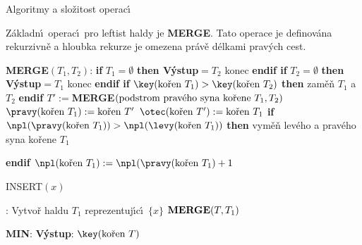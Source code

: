 \documentclass[a4paper,12pt]{article}
\begin{document}
\head
Algoritmy a slo\v zitost operac\'\i
\endhead

\flushpar Z\'akladn\'\i\ operac\'\i\ pro leftist haldy je {\bf MERGE}. Tato 
operace je definov\'ana rekurzivn\v e a hloubka rekurze je omezena 
pr\'av\v e d\'elkami prav\'ych cest.
\bigskip

{\bf MERGE$(T_1,T_2)$}:\newline 
{\bf if} $T_1=\emptyset$ {\bf then V\'ystup$=T_2$} konec {\bf endif\newline 
if} $T_2=\emptyset$ {\bf then V\'ystup$=T_1$} konec {\bf endif\newline 
if} $\key(\text{\rm ko\v ren }T_1)>\key(\text{\rm ko\v ren }T_2)$ {\bf then\newline 
\phantom{{\rm ---}}}zam\v e\v n $T_1$ a $T_2$\newline 
{\bf endif\newline 
$T':=$MERGE$(\text{{{\rm podstrom prav\'eho syna ko\v rene }}}T_1
,T_2)$\newline 
$\pravy(\text{\rm{{\rm ko\v ren }}}T_1):=\text{\rm{{\rm ko\v ren }}}
T'$\newline 
$\otec(\text{\rm {\rm ko\v ren }}T'):=\text{\rm {\rm ko\v ren }}T_
1$\newline 
if} $\npl(\pravy(\text{\rm ko\v ren }T_1))>\npl(\levy(\text{\rm ko\v ren }
T_1))$ {\bf then\newline 
\phantom{{\rm ---}}}vym\v e\v n lev\'eho a prav\'eho syna ko\v rene $
T_1$\newline 
{\bf endif\newline 
$\npl(\text{{\rm {\rm ko\v ren }}}T_1):=\npl(\pravy(\text{{\rm {\rm ko\v ren }}}
T_1)+1$
\bigskip

INSERT$(x)$}:\newline 
Vytvo\v r haldu $T_1$ reprezentuj\'\i c\'\i\ $\{x\}$\newline 
$\bold M\bold E\bold R\bold G\bold E(T,T_1)$
\bigskip

{\bf MIN}:\newline 
{\bf V\'ystup}: $\key(\text{\rm ko\v ren }T)$
\bigskip
\end{document}
